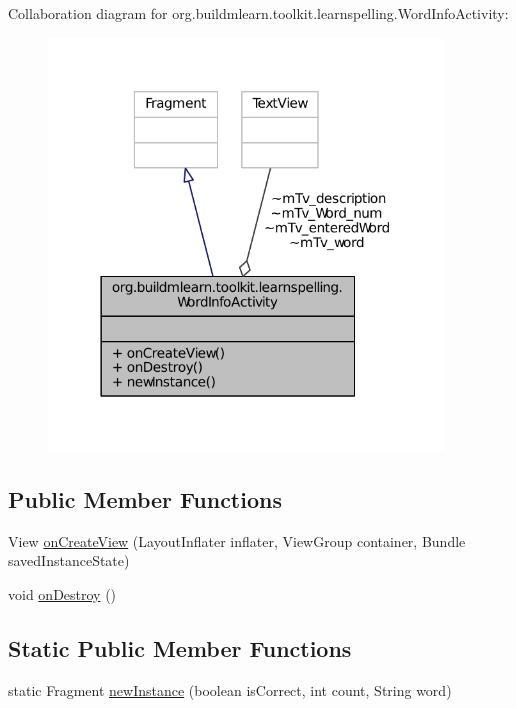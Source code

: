 Collaboration diagram for org.\-buildmlearn.\-toolkit.\-learnspelling.\-Word\-Info\-Activity\-:
\nopagebreak
\begin{figure}[H]
\begin{center}
\leavevmode
\includegraphics[width=297pt]{d8/d54/classorg_1_1buildmlearn_1_1toolkit_1_1learnspelling_1_1WordInfoActivity__coll__graph}
\end{center}
\end{figure}
\subsection*{Public Member Functions}
\begin{DoxyCompactItemize}
\item 
View \hyperlink{classorg_1_1buildmlearn_1_1toolkit_1_1learnspelling_1_1WordInfoActivity_afe7397dee801ecc5696822d9353cfb6b}{on\-Create\-View} (Layout\-Inflater inflater, View\-Group container, Bundle saved\-Instance\-State)
\item 
void \hyperlink{classorg_1_1buildmlearn_1_1toolkit_1_1learnspelling_1_1WordInfoActivity_a127e7b2a66e32383935aa8c343584251}{on\-Destroy} ()
\end{DoxyCompactItemize}
\subsection*{Static Public Member Functions}
\begin{DoxyCompactItemize}
\item 
static Fragment \hyperlink{classorg_1_1buildmlearn_1_1toolkit_1_1learnspelling_1_1WordInfoActivity_addeff677923916e06a7b1f5cd1fec20e}{new\-Instance} (boolean is\-Correct, int count, String word)
\end{DoxyCompactItemize}


